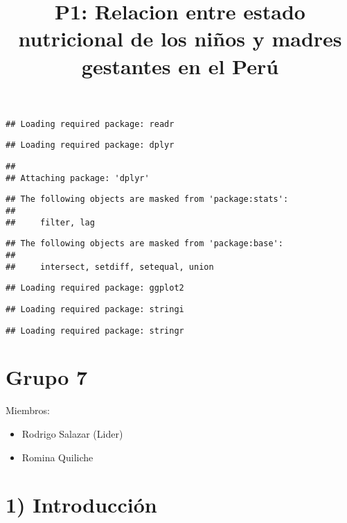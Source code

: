 \documentclass[
]{article}
\title{P1: Relacion entre estado nutricional de los niños y madres
gestantes en el Perú}
\author{}
\date{\vspace{-2.5em}}
\providecommand{\tightlist}{%
  \setlength{\itemsep}{0pt}\setlength{\parskip}{0pt}}
\begin{document}
\maketitle

\begin{verbatim}
## Loading required package: readr
\end{verbatim}

\begin{verbatim}
## Loading required package: dplyr
\end{verbatim}

\begin{verbatim}
## 
## Attaching package: 'dplyr'
\end{verbatim}

\begin{verbatim}
## The following objects are masked from 'package:stats':
## 
##     filter, lag
\end{verbatim}

\begin{verbatim}
## The following objects are masked from 'package:base':
## 
##     intersect, setdiff, setequal, union
\end{verbatim}

\begin{verbatim}
## Loading required package: ggplot2
\end{verbatim}

\begin{verbatim}
## Loading required package: stringi
\end{verbatim}

\begin{verbatim}
## Loading required package: stringr
\end{verbatim}

\hypertarget{grupo-7}{%
\section{Grupo 7}\label{grupo-7}}

Miembros:

\begin{itemize}
\tightlist
\item
  Rodrigo Salazar (Lider)
\item
  Romina Quiliche
\end{itemize}

\hypertarget{introducciuxf3n}{%
\section{1) Introducción}\label{introducciuxf3n}}
\end{document}
